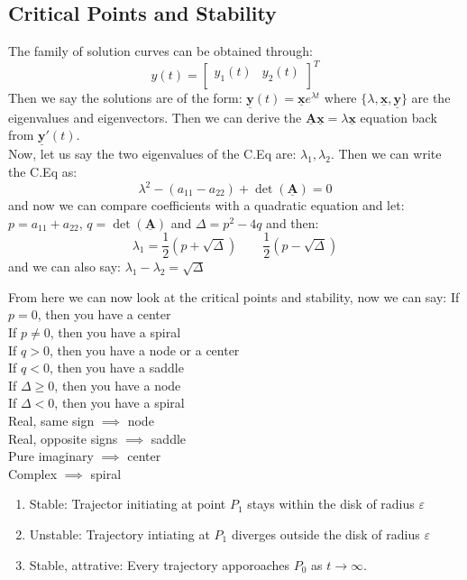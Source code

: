 \documentclass{article}
\renewcommand{\vec}[1]{\underline{\textbf{#1}}}
\renewcommand{\l}{\lambda}
\begin{document}
\subsection{Critical Points and Stability}
The family of solution curves can be obtained through:
$$ y(t) = \begin{bmatrix}
  y_1 (t) & y_2(t) \\
\end{bmatrix}^T $$
Then we say the solutions are of the form: $\displaystyle{\vec y (t)= \vec x e^{\l t}}$ where $\{\l ,\vec x, \vec y \}$ are the eigenvalues and eigenvectors. Then we can derive the $\vec A\vec x = \l\vec x$ equation back from $\vec y'(t)$.\\

Now, let us say the two eigenvalues of the C.Eq are: $\l_1, \l_2$. Then we can write the C.Eq as:
$$ \l^2 - (a_{11} - a_{22}) + \det(\vec A) = 0 $$
and now we can compare coefficients with a quadratic equation and let: $p = a_{11} + a_{22}$, $q = \det(\vec A)$ and $\Delta = p^2 - 4q$ and then:
$$ \l_1 = \frac{1}{2}(p + \sqrt\Delta) \qquad \frac{1}{2}(p - \sqrt\Delta)$$
and we can also say: $\l_1 - \l_2 = \sqrt\Delta$

From here we can now look at the critical points and stability, now we can say:
If $p = 0$, then you have a center\\
If $p\neq 0$, then you have a spiral\\
If $q>0$, then you have a node or a center \\
If $q < 0$, then you have a saddle\\
If $\Delta \geq 0$, then you have a node\\
If $\Delta < 0$, then you have a spiral\\

Real, same sign $\implies$ node\\
Real, opposite signs $\implies$ saddle \\
Pure imaginary $\implies$ center \\
Complex $\implies$ spiral\\

\begin{enumerate}
  \item Stable: Trajector initiating at point $P_1$ stays within the disk of radius $\varepsilon$
  \item Unstable: Trajectory intiating at $P_1$ diverges outside the disk of radius $\varepsilon$
  \item Stable, attrative: Every trajectory apporoaches $P_0$ as $t\to \infty$.
\end{enumerate}
\end{document}
